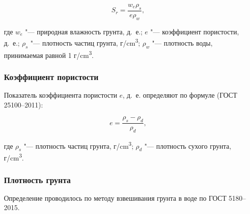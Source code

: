\[
   S_r = \frac{w_e \rho_s}{e \rho_w} \text{,}
\]

где $w_e$ "--- природная влажность грунта, д.~е.;
$e$ "--- коэффициент пористости, д.~е.;
$\rho_s$ "--- плотность частиц грунта, г/\si{\centi\meter^3};
$\rho_w$ "--- плотность воды, принимаемая равной 1 г/\si{\centi\meter^3}.

\subsubsection{Коэффициент пористости}

Показатель коэффициента пористости  $e$, д.~е. определяют по формуле (ГОСТ 25100--2011): 

\[
   \textit{e} = \frac{\rho_s-\rho_d}{\rho_d} \text{,}
\]

где $\rho_s$ "--- плотность частиц грунта, г/\si{\centi\meter^3};
$\rho_d$ "--- плотность сухого грунта, г/\si{\centi\meter^3}.

\subsubsection{Плотность грунта}

Определение проводилось по методу взвешивания грунта в воде по ГОСТ 5180--2015. 

